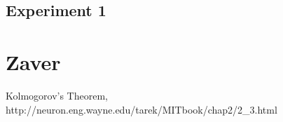 \documentclass[10pt,a5paper]{article}
\begin{document}
\subsection{Experiment 1}



\section{Zaver}





\begin{thebibliography}{4}

 Kolmogorov's Theorem,
http://neuron.eng.wayne.edu/tarek/MITbook/chap2/2\_3.html


\end{thebibliography}
\end{document}
